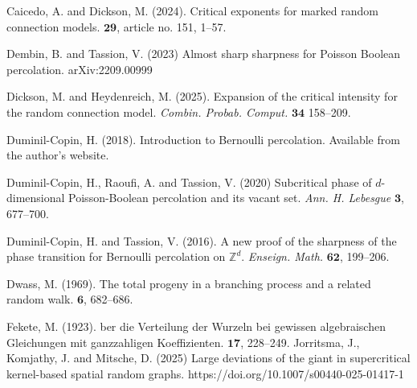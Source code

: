 \documentclass[a4paper,12pt]{scrartcl}
\theoremstyle{definition}
\theoremstyle{remark}
\begin{document}
%
%
\begin{thebibliography}{}

Caicedo, A. and Dickson, M. (2024).
\newblock Critical exponents for marked random connection models.
 $\mathbf{29}$,  article no. 151,
1--57.

Dembin, B. and Tassion, V. (2023)
\newblock Almost sharp sharpness for Poisson Boolean percolation.
\newblock arXiv:2209.00999


Dickson, M. and  Heydenreich, M. (2025).
\newblock Expansion of the critical intensity for the random connection model.
\newblock  %
{\em Combin. Probab. Comput.} $\mathbf{34}$ %
158--209.

Duminil-Copin, H. (2018).
\newblock Introduction to {B}ernoulli percolation.
\newblock Available from the author's website.

Duminil-Copin, H., Raoufi, A. and Tassion, V. (2020)
\newblock
Subcritical phase of $d$-dimensional Poisson-Boolean percolation and its vacant set.
\newblock
{\em Ann. H. Lebesgue} $\mathbf{3}$, 677--700.

Duminil-Copin, H.  and Tassion, V. (2016).
\newblock A new proof of the sharpness of the phase transition for {B}ernoulli
percolation on $\mathbb{Z}^d$.
\newblock
{\em Enseign. Math.} $\mathbf{62}$, %
199--206.

Dwass, M. (1969).
\newblock The {t}otal {p}rogeny in a {b}ranching {p}rocess and a {r}elated
{r}andom {w}alk.
 $\mathbf{6}$,
682--686.

Fekete, M. (1923).
ber die {V}erteilung der {W}urzeln bei gewissen algebraischen
{G}leichungen mit ganzzahligen {K}oeffizienten.
 $\mathbf{17}$,
228--249.
Jorritsma, J., Komjathy, J. and Mitsche, D. (2025)
\newblock Large deviations of the giant in supercritical kernel-based spatial random graphs.
https://doi.org/10.1007/s00440-025-01417-1


\end{thebibliography}
\end{document}
